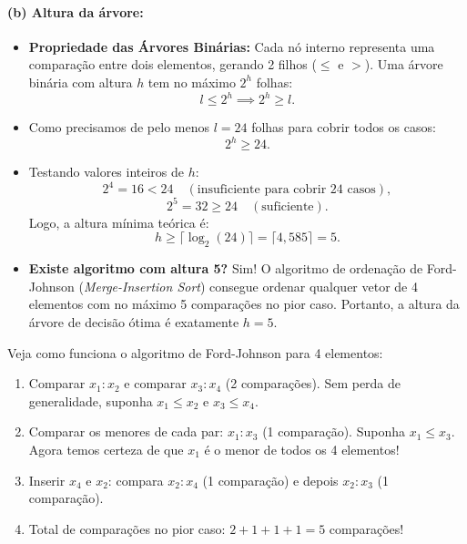 \documentclass[11pt,a4paper]{article}
\begin{document}
\paragraph{(b) Altura da árvore:}
\begin{itemize}
    \item \textbf{Propriedade das Árvores Binárias:} Cada nó interno representa uma comparação entre dois elementos, gerando 2 filhos ($\le$ e $>$). Uma árvore binária com altura $h$ tem no máximo $2^h$ folhas:
    \[
        l \le 2^h \implies 2^h \ge l.
    \]
    \item Como precisamos de pelo menos $l = 24$ folhas para cobrir todos os casos:
    \[
        2^h \ge 24.
    \]
    \item Testando valores inteiros de $h$:
    \[
        2^4 = 16 < 24 \quad (\text{insuficiente para cobrir 24 casos}),
    \]
    \[
        2^5 = 32 \ge 24 \quad (\text{suficiente}).
    \]
    Logo, a altura mínima teórica é:
    \[
        h \ge \lceil \log_2(24) \rceil = \lceil 4{,}585 \rceil = 5.
    \]
    \item \textbf{Existe algoritmo com altura 5?} Sim! O algoritmo de ordenação de Ford-Johnson (\emph{Merge-Insertion Sort}) consegue ordenar qualquer vetor de 4 elementos com no máximo 5 comparações no pior caso. Portanto, a altura da árvore de decisão ótima é exatamente \textbf{$h = 5$}.
\end{itemize}

\begin{dica}[O Algoritmo Ótimo de 5 Comparações para $n=4$]
Veja como funciona o algoritmo de Ford-Johnson para 4 elementos:
\begin{enumerate}
    \item Comparar $x_1 : x_2$ e comparar $x_3 : x_4$ (2 comparações). Sem perda de generalidade, suponha $x_1 \le x_2$ e $x_3 \le x_4$.
    \item Comparar os menores de cada par: $x_1 : x_3$ (1 comparação). Suponha $x_1 \le x_3$. Agora temos certeza de que $x_1$ é o menor de todos os 4 elementos!
    \item Inserir $x_4$ e $x_2$: compara $x_2 : x_4$ (1 comparação) e depois $x_2 : x_3$ (1 comparação).
    \item Total de comparações no pior caso: $2 + 1 + 1 + 1 = 5$ comparações!
\end{enumerate}
\end{dica}
\end{document}

